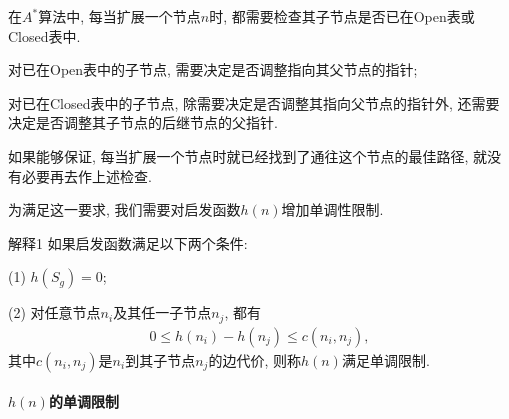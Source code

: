 在$A^*$算法中, 每当扩展一个节点$n$时, 都需要检查其子节点是否已在Open表或Closed表中.

对已在Open表中的子节点, 需要决定是否调整指向其父节点的指针;

对已在Closed表中的子节点, 除需要决定是否调整其指向父节点的指针外, 还需要决定是否调整其子节点的后继节点的父指针.

如果能够保证, 每当扩展一个节点时就已经找到了通往这个节点的最佳路径, 就没有必要再去作上述检查.

为满足这一要求, 我们需要对启发函数$h(n)$增加单调性限制.

\begin{mydef}{解释}{1}
如果启发函数满足以下两个条件:

(1) $h(S_g)=0$;

(2) 对任意节点$n_i$及其任一子节点$n_j$, 都有
\begin{align}
  0\leq h(n_i)-h(n_j)\leq c(n_i, n_j),
\end{align}
其中$c(n_i, n_j)$是$n_i$到其子节点$n_j$的边代价, 则称$h(n)$满足单调限制.
\end{mydef}
\paragraph{$h(n)$的单调限制}~{}

